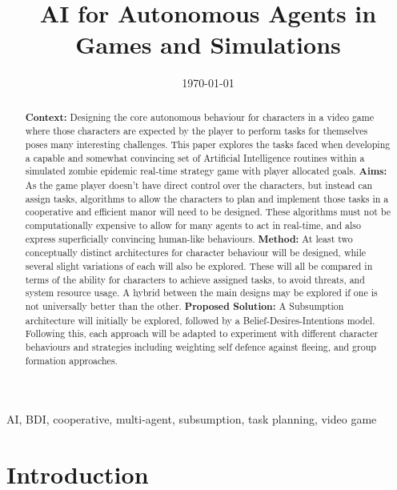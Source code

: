 \documentclass[12pt,a4paper]{article}
\title{AI for Autonomous Agents in Games and Simulations}
\date{\today}
\begin{document}
\maketitle

\begin{abstract} {\bf Context:} Designing the core autonomous behaviour for characters in a video game where those characters are expected by the player to perform tasks for themselves poses many interesting challenges. This paper explores the tasks faced when developing a capable and somewhat convincing set of Artificial Intelligence routines within a simulated zombie epidemic real-time strategy game with player allocated goals.
{\bf Aims:} As the game player doesn't have direct control over the characters, but instead can assign tasks, algorithms to allow the characters to plan and implement those tasks in a cooperative and efficient manor will need to be designed. These algorithms must not be computationally expensive to allow for many agents to act in real-time, and also express superficially convincing human-like behaviours.
{\bf Method:} At least two conceptually distinct architectures for character behaviour will be designed, while several slight variations of each will also be explored. These will all be compared in terms of the ability for characters to achieve assigned tasks, to avoid threats, and system resource usage. A hybrid between the main designs may be explored if one is not universally better than the other.
{\bf Proposed Solution:} A Subsumption architecture will initially be explored, followed by a Belief-Desires-Intentions model. Following this, each approach will be adapted to experiment with different character behaviours and strategies including weighting self defence against fleeing, and group formation approaches.
\end{abstract}

\begin{keywords}
AI, BDI, cooperative, multi-agent, subsumption, task planning, video game
\end{keywords}

\section{Introduction}
\end{document}
